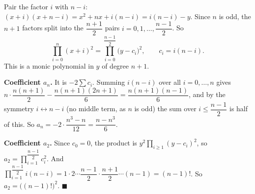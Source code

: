 Pair the factor $i$ with $n-i$: $(x+i)(x+n-i)=x^2+nx+i(n-i)=i(n-i)-y$. Since $n$ is odd, the $n+1$ factors split into the $\dfrac{n+1}2$ pairs $i=0,1,\dots,\dfrac{n-1}2$. So
\[\prod_{i=0}^n(x+i)^2=\prod_{i=0}^{\dfrac{n-1}2}\bigl(y-c_i\bigr)^2,\qquad c_i=i(n-i).\]
This is a monic polynomial in $y$ of degree $n+1$.

\textbf{Coefficient $a_n$.} It is $-2\sum c_i$. Summing $i(n-i)$ over all $i=0,\dots,n$ gives $n\cdot\dfrac{n(n+1)}2-\dfrac{n(n+1)(2n+1)}6=\dfrac{n(n+1)(n-1)}6$, and by the symmetry $i\leftrightarrow n-i$ (no middle term, as $n$ is odd) the sum over $i\le\dfrac{n-1}2$ is half of this. So $a_n=-2\cdot\dfrac{n^3-n}{12}=\dfrac{n-n^3}6$.

\textbf{Coefficient $a_2$.} Since $c_0=0$, the product is $y^2\prod_{i\ge1}(y-c_i)^2$, so $a_2=\prod_{i=1}^{\dfrac{n-1}2}c_i^2$. And $\prod_{i=1}^{\dfrac{n-1}2}i(n-i)=1\cdot2\cdots\dfrac{n-1}2\cdot\dfrac{n+1}2\cdots(n-1)=(n-1)!$. So $a_2=\bigl((n-1)!\bigr)^2$. $\blacksquare$

